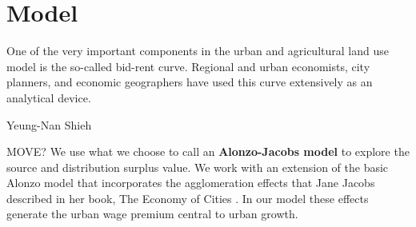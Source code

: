 \chapter{Model}  \label{chapter-model}
\epigraph{One of the very important components in the urban and agricultural land use model is the so-called \gls{bid-rent curve}. Regional and urban economists, city planners, and economic geographers have used this curve extensively as an analytical device.}{Yeung-Nan Shieh\cite{shiehWilhelmLaunhardtBidRent2004}}

MOVE? We use what we choose to call an \textbf{\gls{Alonzo-Jacobs model}} to explore the source and distribution surplus value. We  work with an extension of the basic Alonzo model that incorporates the \gls{agglomeration effects} that Jane Jacobs  described in her book, The Economy of Cities \cite{jacobsEconomyCities1969}. In our model these effects generate the \gls{urban wage premium} central to urban growth. %









